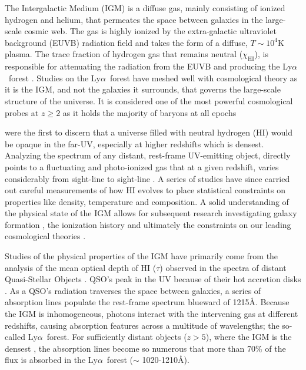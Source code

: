 \documentclass[twocolumn,tight,times]{aastex63}
\newcommand{\lya}{Ly$\alpha$}
\begin{document}
The Intergalactic Medium (IGM) is a diffuse gas, mainly consisting of ionized hydrogen and helium, that permeates the space between galaxies in the large-scale cosmic web. The gas is highly ionized by the extra-galactic ultraviolet background (EUVB) radiation field and takes the form of a diffuse, $T\sim10^4$K plasma. The trace fraction of hydrogen gas that remains neutral ($\chi_\mathrm{HI}$), is responsible for attenuating the radiation from the EUVB and producing the \lya\ forest \citep[see][for a review]{McQuinn_2016}. Studies on the \lya\ forest have meshed well with cosmological theory as it is the IGM, and not the galaxies it surrounds, that governs the large-scale structure of the universe. It is considered one of the most powerful cosmological probes at $z \geq 2$ as it holds the majority of baryons at all epochs \citep[e.g.][]{Becker_2007} 

\cite{Gunn_Peterson_1965} were the first to discern that a universe filled with neutral hydrogen (HI) would be opaque in the far-UV, especially at higher redshifts which is densest. Analyzing the spectrum of any distant, rest-frame UV-emitting object, directly points to a fluctuating and photo-ionized gas that at a given redshift, varies considerably from sight-line to sight-line \citep{Shapley_2003}. A series of studies \citep[e.g.][]{Dall'Aglio_2008, Faucher-Giguere_2008, Becker_2013} have since carried out careful measurements of how HI evolves to place statistical constraints on properties like density, temperature and composition. A solid understanding of the physical state of the IGM allows for subsequent research investigating galaxy formation \citep{Hassan_2020}, the ionization history \citep{Theuns_2002, Bernardi_2003, Kirkman_2005} and ultimately the constraints on our leading cosmological theories \citep{Rauch_1998, Becker_2007}.

Studies of the physical properties of the IGM have primarily come from the analysis of the mean optical depth of HI ($\tau$) observed in the spectra of distant Quasi-Stellar Objects \citep[QSOs;][]{Prochaska_2009, Becker_2007, Faucher-Giguere_2008, Kirkman_2005}. QSO's peak in the UV because of their hot accretion disks \citep[AGN;][]{Meiksin_2009}. As a QSO's radiation traverses the space between galaxies, a series of absorption lines populate the rest-frame spectrum blueward of 1215\AA. Because the IGM is inhomogeneous, photons interact with the intervening gas at different redshifts, causing absorption features across a multitude of wavelengths; the so-called \lya\ forest. For sufficiently distant objects ($z > 5$), where the IGM is the densest \citep{Mcdonald_2006}, the absorption lines become so numerous that more than 70\% of the flux is absorbed in the \lya\ forest ($\sim$ 1020-1210\AA). 
\end{document}
